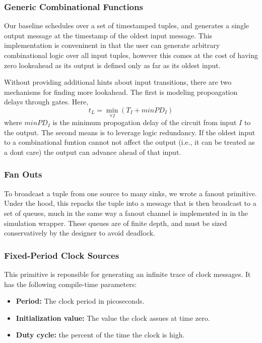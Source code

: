 \subsubsection{Generic Combinational Functions}
Our baseline schedules over a set of timestamped tuples, and generates a single
output message at the timestamp of the oldest input message. This
implementation is conveninent in that the user can generate arbitrary
combinational logic over all input tuples, however this comes at the cost of
having zero lookeahead as its output is defined only as far as its oldest input.

Without providing additional hints about input transitions, there are two
mechanisms for finding more lookahead.  The first is modeling propoagation
delays through gates. Here, $$t_L = \min_{\forall I} (T_{I} + minPD_{I})$$
where $minPD_{I}$ is the minimum propogation delay of the circuit from input $I$ to
the output.  The second means is to leverage logic redundancy. If the oldest
input to a combinational funtion cannot not affect the output (i.e., it can be
treated as a dont care) the output can advance ahead of that input.

\subsubsection{Fan Outs}
To broadcast a tuple from one source to many sinks, we wrote a fanout
primitive. Under the hood, this repacks the tuple into a message that is then
broadcast to a set of queues, much in the same way a fanout channel is
implemented in in the simulation wrapper. These queues are of finite depth, and
must be sized conservatively by the designer to avoid deadlock.

\subsubsection{Fixed-Period Clock Sources}

This primitive is reponsible for generating an infinite trace of clock messages. It has the following
compile-time parameters:
\begin{itemize}
 \item \textbf{Period:} The clock period in picoseconds.
 \item \textbf{Initialization value:} The value the clock assues at time zero.
 \item \textbf{Duty cycle:} the percent of the time the clock is high.
\end{itemize}

